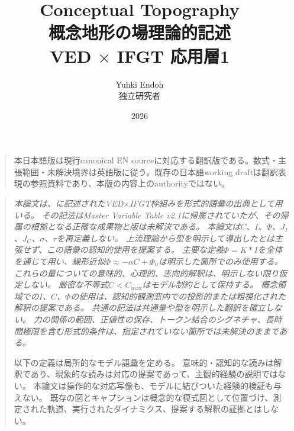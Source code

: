 \documentclass[11pt, a4paper]{ltjsarticle}
\newcommand{\JI}{J_{\!I}}
\newcommand{\JC}{J_{\!C}}
\newcommand{\Cmax}{C_{\max}}
\begin{document}

\title{%
  \textbf{Conceptual Topography}\\[6pt]
  {\large 概念地形の場理論的記述}\\[4pt]
  {\normalsize VED $\times$ IFGT 応用層1}
}
\author{%
  Yuhki Endoh\\
  {\small 独立研究者}
}
\date{2026}
\maketitle

\begin{quote}
\small
本日本語版は現行canonical EN sourceに対応する翻訳版である。数式・主張範囲・未解決境界は英語版に従う。既存の日本語working draftは翻訳表現の参照資料であり、本版の内容上のauthorityではない。
\end{quote}

\begin{quote}
\small\itshape
本論文は、\cite{VED_vol1,VED_vol2,VED_vol3,VED_vol4,IFGT}に記述されたVED$\times$IFGT枠組みを形式的語彙の出典として用いる。
その記法はMaster Variable Table v2.1に帰属されていたが、その帰属の根拠となる正確な成果物と版は未解決である。
本論文は$C$、$I$、$\Phi$、$\JI$、$\JC$、$\sigma$、$\tau$を再定義しない。
上流理論から型を明示して導出したとは主張せず、この語彙の認知的使用を提案する。
主要な定義$\Phi = K*I$を全体を通じて用い、線形近似$\Phi \approx -\alpha C + \Phi_0$は明示した箇所でのみ使用する。
これらの量についての意味的、心理的、志向的解釈は、明示しない限り仮定しない。
厳密な不等式$C < \Cmax$はモデル制約として保持する。
概念領域での$I$、$C$、$\Phi$の使用は、認知的観測窓内での投影的または粗視化された解釈の提案である。
共通の記法は共通量や型を明示した翻訳を確立しない。
力の関係の範囲、正値性の保存、トークン結合のシグネチャ、長時間極限を含む形式的条件は、指定されていない箇所では未解決のままである。

以下の定義は局所的なモデル語彙を定める。
意味的・認知的な読みは解釈であり、現象的な読みは対応の提案であって、主観的経験の説明ではない。
本論文は操作的な対応写像も、モデルに結びついた経験的検証も与えない。
既存の図とキャプションは概念的な模式図として位置づけ、測定された軌道、実行されたダイナミクス、提案する解釈の証拠とはしない。
\end{quote}

\vspace{4pt}


\newpage
\tableofcontents
\newpage















\end{document}
